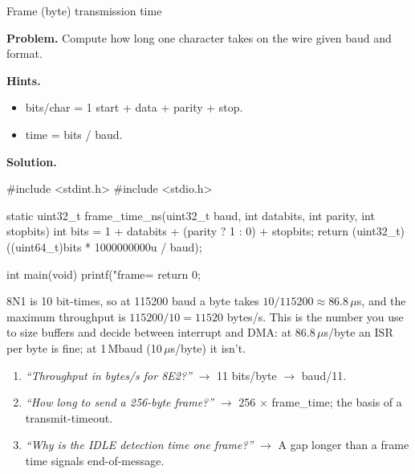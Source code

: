 \begin{gymproblem}{Frame (byte) transmission time}

\textbf{Problem.} Compute how long one character takes on the wire given baud
and format.

\textbf{Hints.}
\begin{itemize}
\item bits/char = 1 start + data + parity + stop.
\item time = bits / baud.
\end{itemize}

\attempt

\textbf{Solution.}
\begin{cgym}
#include <stdint.h>
#include <stdio.h>

static uint32_t frame_time_ns(uint32_t baud, int databits, int parity, int stopbits) {
    int bits = 1 + databits + (parity ? 1 : 0) + stopbits;
    return (uint32_t)((uint64_t)bits * 1000000000u / baud);
}

int main(void) {
    printf("frame=%
    return 0;
}
\end{cgym}

8N1 is 10 bit-times, so at 115200 baud a byte takes $10/115200 \approx
86.8\,\mu$s, and the maximum throughput is $115200/10 = 11520$ bytes/s. This is
the number you use to size buffers and decide between interrupt and DMA: at
86.8\,$\mu$s/byte an ISR per byte is fine; at 1\,Mbaud (10\,$\mu$s/byte) it
isn't.

\followups
\begin{enumerate}
\item \emph{``Throughput in bytes/s for 8E2?''} $\rightarrow$ 11 bits/byte
  $\rightarrow$ baud/11.
\item \emph{``How long to send a 256-byte frame?''} $\rightarrow$
  256 $\times$ frame\_time; the basis of a transmit-timeout.
\item \emph{``Why is the IDLE detection time one frame?''} $\rightarrow$ A gap
  longer than a frame time signals end-of-message.
\end{enumerate}
\end{gymproblem}

